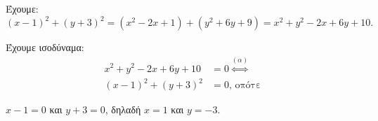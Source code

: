 
\begin{alist}
\item Έχουμε:
\[(x - 1)^2 + (y + 3)^2 = (x^2 - 2x + 1) + (y^2 + 6y + 9) = x^2 + y^2 - 2x + 6y + 10.\]

\item Έχουμε ισοδύναμα:
\begin{align*}
x^2 + y^2 - 2x + 6y + 10 &= 0 \overset{(\alpha)}{\Leftrightarrow} \\
(x - 1)^2 + (y + 3)^2 &= 0\text{, οπότε}
\end{align*}

$x - 1 = 0$ και $y + 3 = 0$, δηλαδή
$x = 1$ και $y = -3$.
\end{alist}

